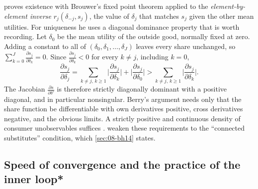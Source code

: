\begin{remark}\label{rem:08-berry-proof}
\citet[pp.~260--261]{Berry1994} proves existence with Brouwer's fixed point theorem applied to the
\emph{element-by-element inverse} $r_j(\delta_{-j}, s_j)$, the value of $\delta_j$ that matches $s_j$ given
the other mean utilities. For uniqueness he uses a diagonal dominance property that is worth recording. Let
$\delta_0$ be the mean utility of the outside good, normally fixed at zero. Adding a constant to all of
$(\delta_0, \delta_1, \dots, \delta_J)$ leaves every share unchanged, so $\sum_{k=0}^{J}\frac{\partial
s_j}{\partial \delta_k} = 0$. Since $\frac{\partial s_j}{\partial \delta_k} < 0$ for every $k \neq j$,
including $k = 0$,
\begin{equation*}
  \frac{\partial s_j}{\partial \delta_j} = \sum_{k \neq j,\, k \geq 1}\Big|\frac{\partial s_j}{\partial
  \delta_k}\Big| + \Big|\frac{\partial s_j}{\partial \delta_0}\Big| > \sum_{k \neq j,\, k \geq
  1}\Big|\frac{\partial s_j}{\partial \delta_k}\Big|.
\end{equation*}
The Jacobian $\frac{\partial s}{\partial \delta'}$ is therefore strictly diagonally dominant with a positive
diagonal, and in particular nonsingular. Berry's argument needs only that the share function be
differentiable with own derivatives positive, cross derivatives negative, and the obvious limits. A strictly
positive and continuous density of consumer unobservables suffices \citep[p.~260]{Berry1994}.
\citet{BerryGandhiHaile2013} weaken these requirements to the ``connected substitutes'' condition, which
\cref{sec:08-bh14} states.
\end{remark}

\subsection{Speed of convergence and the practice of the inner loop*}\label{sec:08-inv-practice}


